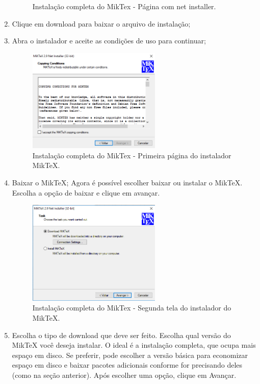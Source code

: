 \begin{enumerate}
\begin{figure}[H]
  \caption{Instalação  completa do MikTex - Página com net installer.}
\end{figure}
\item Clique em download para baixar o arquivo de instalação;
\item Abra o instalador e aceite as condições de uso para continuar;
\begin{figure}[H]
  \centering
  \includegraphics[width=0.6\textwidth]{./fig/miktex11}
  \caption{Instalação completa do MikTex - Primeira página do instalador MikTeX.}
\end{figure}
\item Baixar o MikTeX;
Agora é possível escolher baixar ou instalar o MikTeX. Escolha a opção de baixar e clique em avançar.
\begin{figure}[H]
  \centering
  \includegraphics[width=0.6\textwidth]{./fig/miktex12}
  \caption{Instalação completa do MikTex - Segunda tela do instalador do MikTeX.}
\end{figure}
\item Escolha o tipo de download que deve ser feito.
Escolha qual versão do MikTeX você deseja instalar. O ideal é a instalação completa, que ocupa mais espaço em disco. Se preferir, pode escolher a versão básica para economizar espaço em disco e baixar pacotes adicionais conforme for precisando deles (como na seção anterior). Após escolher uma opção, clique em Avançar.

\end{enumerate}
